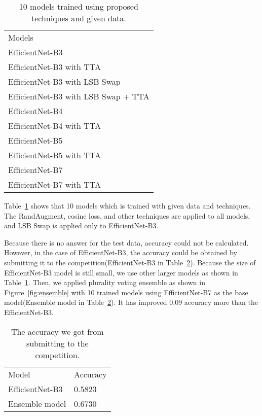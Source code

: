 \documentclass[runningheads]{llncs}
\begin{document}
\setlength{\tabcolsep}{4pt}
\begin{table}
\begin{center}
\caption{10 models trained using proposed techniques and given data.}
\label{table:1}
\begin{tabular}{l}
\hline\noalign{\smallskip}
Models\\
\noalign{\smallskip}
\hline
\noalign{\smallskip}
EfficientNet-B3~\cite{tan2019efficientnet}\\
EfficientNet-B3 with TTA\\
EfficientNet-B3 with LSB Swap\\
EfficientNet-B3 with LSB Swap + TTA\\
EfficientNet-B4\\
EfficientNet-B4 with TTA\\
EfficientNet-B5\\
EfficientNet-B5 with TTA\\
EfficientNet-B7\\
EfficientNet-B7 with TTA\\
\hline
\end{tabular}
\end{center}
\end{table}
\setlength{\tabcolsep}{1.4pt}

Table~\ref{table:1} shows that 10 models which is trained with given data and techniques. The RandAugment, cosine loss, and other techniques are applied to all models, and LSB Swap is applied only to EfficientNet-B3.

Because there is no answer for the test data, accuracy could not be calculated. However, in the case of EfficientNet-B3, the accuracy could be obtained by submitting it to the competition(EfficientNet-B3 in Table~\ref{table:2}). Because the size of EfficientNet-B3 model is still small, we use other larger models as shown in Table~\ref{table:1}. Then, we applied plurality voting ensemble as shown in Figure~\ref{fig:ensemble} with 10 trained models using EfficientNet-B7 as the base model(Ensemble model in Table~\ref{table:2}). It has improved 0.09 accuracy more than the EfficientNet-B3.


\setlength{\tabcolsep}{4pt}
\begin{table}
\begin{center}
\caption{The accuracy we got from submitting to the competition.}
\label{table:2}
\begin{tabular}{ll}
\hline\noalign{\smallskip}
Model & Accuracy\\
\noalign{\smallskip}
\hline
\noalign{\smallskip}
EfficientNet-B3 & 0.5823\\
Ensemble model & 0.6730\\
\hline
\end{tabular}
\end{center}
\end{table}
\setlength{\tabcolsep}{1.4pt}
\end{document}
